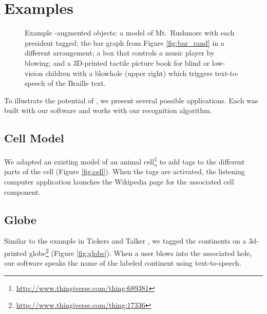   \section{Examples}
    \begin{figure*}
        \centering
        \caption{Example \bh-augmented objects: \protect{} a
          model of Mt.~Rushmore with each president tagged;
          \protect{} the bar graph from Figure
          \ref{fig:bar_rand} in a different arrangement;
          \protect{} a box that controls a music player by
          blowing; and \protect{} a 3D-printed tactile
          picture book for blind or low-vision children with a blowhole (upper
          right) which triggers text-to-speech of the Braille text.}
        \label{fig:blowhole_demo2}
    \end{figure*}

    To illustrate the potential of \bh, we present several possible
    applications. Each was built with our software and works with our
    recognition algorithm.
    
    \subsection*{Cell Model} 
      We adapted an existing model of an animal
      cell\footnote{\url{http://www.thingiverse.com/thing:689381}} to add \bh
      tags to the different parts of the cell (Figure \ref{fig:cell}). When the
      tags are activated, the listening computer application launches the
      Wikipedia page for the associated cell component.
        
    \subsection*{Globe} 
      Similar to the example in Tickers and Talker \cite{Shi:2016}, we tagged
      the continents on a 3d-printed
      globe\footnote{\url{http://www.thingiverse.com/thing:17336}} (Figure
      \ref{fig:globe}). When a user blows into the associated hole, our software
      speaks the name of the labeled continent using text-to-speech. 
    
